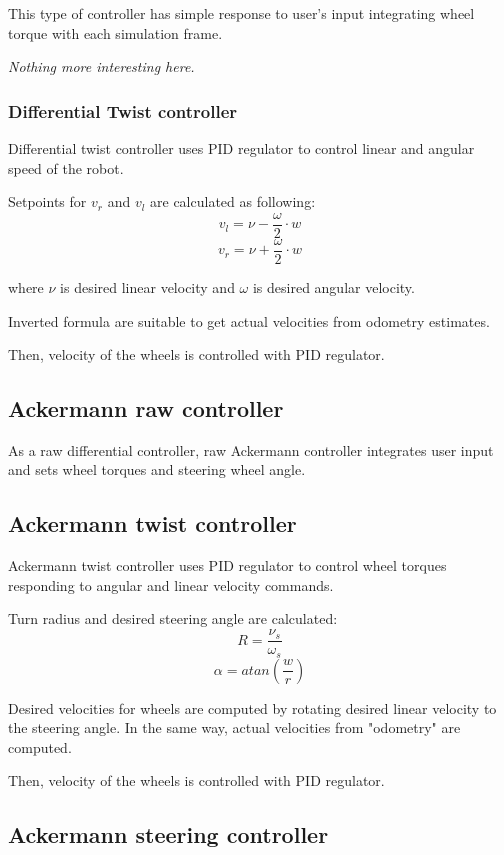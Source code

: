 \documentclass[a4paper,11pt]{article}
\begin{document}
This type of controller has simple response to user's input integrating wheel torque with each simulation frame.

\textit{Nothing more interesting here.}

\subsubsection{Differential Twist controller}

Differential twist controller uses PID regulator to control linear and angular speed of the robot. 

Setpoints for $v_r$ and $v_l$ are calculated as following:
\[
v_l = \nu - \frac{\omega}{2} \cdot w
\]
\[
v_r = \nu + \frac{\omega}{2} \cdot w
\]

where $\nu$ is desired linear velocity and $\omega$ is desired angular velocity.


Inverted formula are suitable to get actual velocities from odometry estimates.


Then, velocity of the wheels is controlled with PID regulator.

\subsection{Ackermann raw controller}

As a raw differential controller, raw Ackermann controller integrates user input and sets wheel torques and steering wheel angle.

\subsection{Ackermann twist controller}

Ackermann twist controller uses PID regulator to control wheel torques responding to angular and linear velocity commands. 

Turn radius and desired steering angle are calculated: 
\[
R = \frac{\nu_s}{\omega_s}
\]
\[
\alpha = atan(\frac{w}{r})
\]

Desired velocities for wheels are computed by rotating desired linear velocity to the steering angle. 
In the same way, actual velocities from "odometry" are computed.

Then, velocity of the wheels is controlled with PID regulator.

\subsection{Ackermann steering controller}
\end{document}
